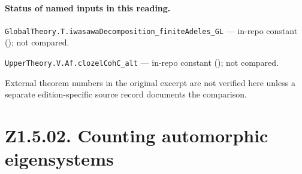 
\paragraph{Status of named inputs in this reading.}
\noindent\nolinkurl{GlobalTheory.T.iwasawaDecomposition_finiteAdeles_GL} --- in-repo constant (); not compared.\par
\noindent\nolinkurl{UpperTheory.V.Af.clozelCohC_alt} --- in-repo constant (); not compared.\par
External theorem numbers in the original excerpt are not verified here unless a separate edition-specific source record documents the comparison.

\section*{Z1.5.02. Counting automorphic eigensystems}

